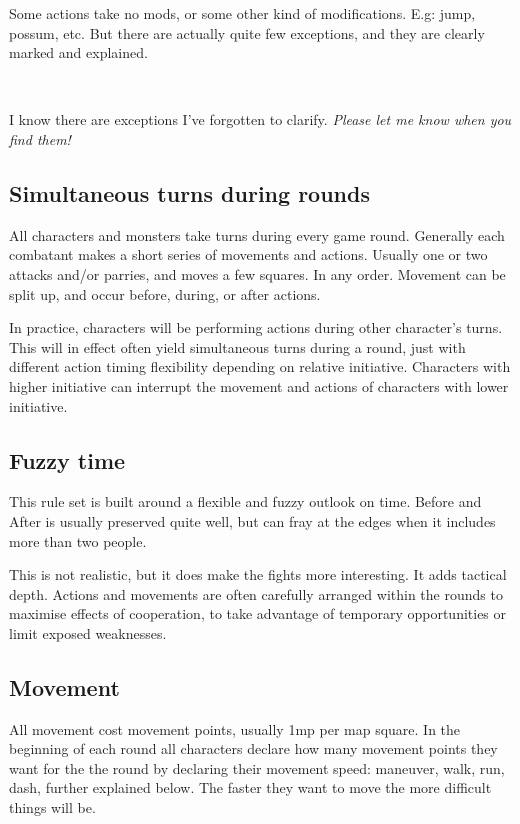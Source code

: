 Some actions take no mods, or some other kind of modifications. E.g: jump, possum, etc. But there are actually quite few exceptions, and they are clearly marked and explained.

\

\todo I know there are exceptions I've forgotten to clarify. \emph{Please let me know when you find them!}


\subsection*{Simultaneous turns during rounds}
All characters and monsters take turns during every game round. Generally each combatant makes a short series of movements and actions. Usually one or two attacks and/or parries, and moves a few squares. In any order. Movement can be split up, and occur before, during, or after actions.

In practice, characters will be performing actions during other character's turns. This will in effect often yield simultaneous turns during a round, just with different action timing flexibility depending on relative initiative. Characters with higher initiative can interrupt the movement and actions of characters with lower initiative.


\subsection*{Fuzzy time}
This rule set is built around a flexible and fuzzy outlook on time. Before and After is usually preserved quite well, but can fray at the edges when it includes more than two people.

This is not realistic, but it does make the fights more interesting. It adds tactical depth. Actions and movements are often carefully arranged within the rounds to maximise effects of cooperation, to take advantage of temporary opportunities or limit exposed weaknesses.


\subsection*{Movement}
All movement cost movement points, usually 1mp per map square. In the beginning of each round all characters declare how many movement points they want for the the round by declaring their movement speed: maneuver, walk, run, dash, further explained below. The faster they want to move the more difficult things will be.

